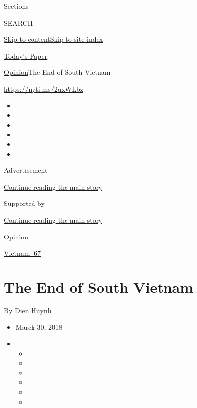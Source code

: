 Sections

SEARCH

\protect\hyperlink{site-content}{Skip to
content}\protect\hyperlink{site-index}{Skip to site index}

\href{https://myaccount.nytimes.com/auth/login?response_type=cookie\&client_id=vi}{}

\href{https://www.nytimes.com/section/todayspaper}{Today's Paper}

\href{/section/opinion}{Opinion}\textbar{}The End of South Vietnam

\href{https://nyti.ms/2uxWLbz}{https://nyti.ms/2uxWLbz}

\begin{itemize}
\item
\item
\item
\item
\item
\item
\end{itemize}

Advertisement

\protect\hyperlink{after-top}{Continue reading the main story}

Supported by

\protect\hyperlink{after-sponsor}{Continue reading the main story}

\href{/section/opinion}{Opinion}

\href{/column/vietnam-67}{Vietnam '67}

\hypertarget{the-end-of-south-vietnam}{%
\section{The End of South Vietnam}\label{the-end-of-south-vietnam}}

By Dien Huynh

\begin{itemize}
\item
  March 30, 2018
\item
  \begin{itemize}
  \item
  \item
  \item
  \item
  \item
  \item
  \end{itemize}
\end{itemize}

